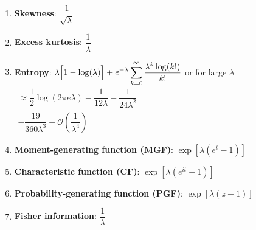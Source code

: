 \begin{enumerate}

    \item \textbf{Skewness}:
    $
         {\displaystyle {\dfrac {1}{\sqrt {\lambda }}}}
    $
    \hfill \cite{wiki/Poisson_distribution}

    \item \textbf{Excess kurtosis}:
    $
         {\displaystyle {\dfrac {1}{\lambda }}}
    $
    \hfill \cite{wiki/Poisson_distribution}

    \item \textbf{Entropy}:
    ${\displaystyle \lambda {\Bigl [}1-\log(\lambda ){\Bigr ]}+e^{-\lambda }\sum _{k=0}^{\infty }{\dfrac {\lambda ^{k}\log(k!)}{k!}}}$
    or for large ${\displaystyle \lambda }$
    ${\displaystyle {\begin{aligned}\approx {\dfrac {1}{2}}\log \left(2\pi e\lambda \right)-{\dfrac {1}{12\lambda }}-{\dfrac {1}{24\lambda ^{2}}}\\-{\dfrac {19}{360\lambda ^{3}}}+{\mathcal {O}}\left({\dfrac {1}{\lambda ^{4}}}\right)\end{aligned}}}$
    \hfill \cite{wiki/Poisson_distribution}

    \item \textbf{Moment-generating function (MGF)}:
    $
         {\displaystyle \exp \left[\lambda \left(e^{t}-1\right)\right]}
    $
    \hfill \cite{wiki/Poisson_distribution}

    \item \textbf{Characteristic function (CF)}:
    $
         {\displaystyle \exp \left[\lambda \left(e^{it}-1\right)\right]}
    $
    \hfill \cite{wiki/Poisson_distribution}

    \item \textbf{Probability-generating function (PGF)}:
    $
         {\displaystyle \exp \left[\lambda \left(z-1\right)\right]}
    $
    \hfill \cite{wiki/Poisson_distribution}

    \item \textbf{Fisher information}:
    $
         {\displaystyle {\dfrac {1}{\lambda }}}
    $
    \hfill \cite{wiki/Poisson_distribution}
\end{enumerate}

















